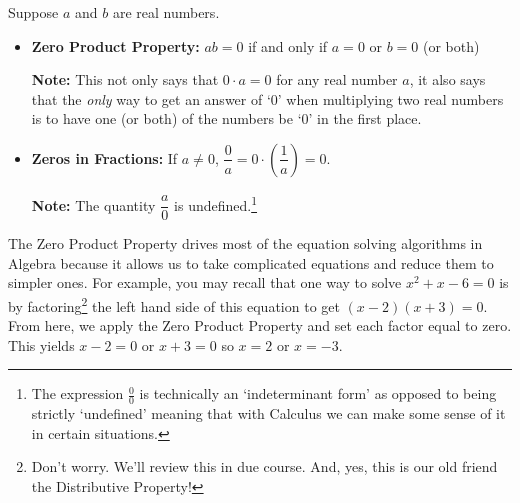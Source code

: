 \label{propertiesofzero}

\colorbox{ResultColor}{\bbm
\begin{thm}

Suppose $a$ and $b$ are real numbers.

\begin{itemize}

\item  \textbf{Zero Product Property:} $ab = 0$ if and only if $a=0$ or $b=0$ (or both)

\textbf{Note:} This not only says that $0 \cdot a = 0$ for any real number $a$, it also says that the \textit{only} way to get an answer of `$0$' when multiplying two real numbers  is to have one (or both) of the numbers be `$0$' in the first place.

\item  \textbf{Zeros in Fractions:}  If $a \neq 0$, $\dfrac{0}{a} = 0 \cdot \left(\dfrac{1}{a}\right) = 0$.

\textbf{Note:}  The quantity $\dfrac{a}{0}$ is undefined.\footnote{The expression $\frac{0}{0}$ is technically an `indeterminant form' as opposed to being strictly `undefined' meaning that with Calculus we can make some sense of it in certain situations.  }

\end{itemize}
\end{thm}
\ebm}


The Zero Product Property drives most of the equation solving algorithms in Algebra because it allows us to take complicated equations and reduce them to simpler ones.  For example, you may recall that one way to solve  $x^2+x-6=0$ is by factoring\footnote{Don't worry.  We'll review this in due course.  And, yes, this is our old friend the Distributive Property!} the left hand side of this equation to get  $(x-2)(x+3) = 0$.  From here, we apply the Zero Product Property and set each factor equal to zero.  This yields  $x-2=0$ or $x+3=0$ so $x=2$ or $x=-3$.  

\medskip

